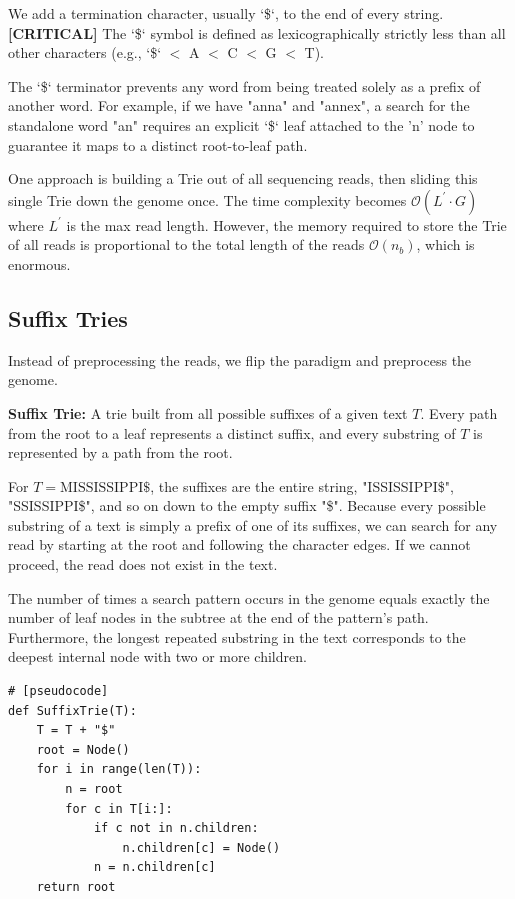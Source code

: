 \documentclass[11pt,a4paper]{article}
\newenvironment{important}{%
    \begin{tcolorbox}[colback=blue!5, colframe=blue!80!black, arc=4mm, boxrule=1pt]
}{%
    \end{tcolorbox}
}
\newcommand{\sta}{\textbf{[CRITICAL] }}
\begin{document}
We add a termination character, usually `\$`, to the end of every string.
\sta The `\$` symbol is defined as lexicographically strictly less than all other characters (e.g., `\$` $<$ A $<$ C $<$ G $<$ T).

The `\$` terminator prevents any word from being treated solely as a prefix of another word. For example, if we have "anna" and "annex", a search for the standalone word "an" requires an explicit `\$` leaf attached to the 'n' node to guarantee it maps to a distinct root-to-leaf path.

One approach is building a Trie out of all sequencing reads, then sliding this single Trie down the genome once. The time complexity becomes $\mathcal{O}(L^{\prime} \cdot G)$ where $L^{\prime}$ is the max read length.
However, the memory required to store the Trie of all reads is proportional to the total length of the reads $\mathcal{O}(n_b)$, which is enormous.

\subsection{Suffix Tries}
Instead of preprocessing the reads, we flip the paradigm and preprocess the genome. 

\begin{important}
    \textbf{Suffix Trie:} A trie built from all possible suffixes of a given text $T$. Every path from the root to a leaf represents a distinct suffix, and every substring of $T$ is represented by a path from the root.
\end{important}

For $T = \text{MISSISSIPPI\$}$, the suffixes are the entire string, "ISSISSIPPI\$", "SSISSIPPI\$", and so on down to the empty suffix "\$".
Because every possible substring of a text is simply a prefix of one of its suffixes, we can search for any read by starting at the root and following the character edges. If we cannot proceed, the read does not exist in the text.

The number of times a search pattern occurs in the genome equals exactly the number of leaf nodes in the subtree at the end of the pattern's path. Furthermore, the longest repeated substring in the text corresponds to the deepest internal node with two or more children.

\begin{verbatim}
# [pseudocode]
def SuffixTrie(T):
    T = T + "$"
    root = Node()
    for i in range(len(T)):
        n = root
        for c in T[i:]:
            if c not in n.children:
                n.children[c] = Node()
            n = n.children[c]
    return root
\end{verbatim}
\end{document}
